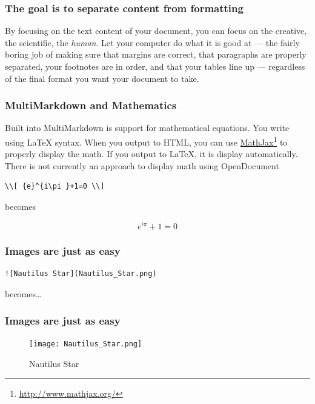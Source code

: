 \begin{frame}[fragile]
\frametitle{The goal is to separate content from formatting }
\label{thegoalistoseparatecontentfromformatting}

By focusing on the text content of your document, you can focus on the
creative, the scientific, the \emph{human}. Let your computer do what it is good at
--- the fairly boring job of making sure that margins are correct, that
paragraphs are properly separated, your footnotes are in order, and that your
tables line up --- regardless of the final format you want your document to
take.

\end{frame}

\begin{frame}[fragile]
\frametitle{MultiMarkdown and Mathematics }
\label{multimarkdownandmathematics}

Built into MultiMarkdown is support for mathematical equations. You write
using LaTeX syntax. When you output to HTML, you can use
\href{http://www.mathjax.org/}{MathJax}\footnote{\href{http://www.mathjax.org/}{http:\slash \slash www.mathjax.org\slash }} to properly display the math. If you output
to LaTeX, it is display automatically. There is not currently an approach to
display math using OpenDocument

\begin{verbatim}
\\[ {e}^{i\pi }+1=0 \\]
\end{verbatim}

becomes

\[ {e}^{i\pi }+1=0 \]

\end{frame}

\begin{frame}[fragile]
\frametitle{Images are just as easy }
\label{imagesarejustaseasy}

\begin{verbatim}
![Nautilus Star](Nautilus_Star.png)
\end{verbatim}

becomes{\ldots}

\end{frame}

\begin{frame}[fragile]
\frametitle{Images are just as easy }
\label{imagesarejustaseasy}

\begin{figure}[htbp]
\centering
\texttt{[image: Nautilus\_Star.png]}
\caption{Nautilus Star}
\end{figure}

\end{frame}

